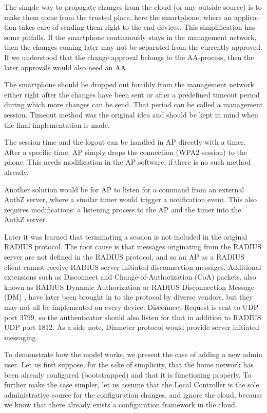 \documentclass[12pt,a4paper,english]{tutthesis}
\begin{document}
\begin{otherlanguage}{english}
The simple way to propagate changes from the cloud (or any outside
source) is to make them come from the trusted place, here the smartphone,
where an application takes care of sending them right to the end
devices. This simplification has some pitfalls. If the smartphone continuously stays
in the management network, then the changes coming later may not be 
separated from the currently approved.
If we understood that the change approval belongs to the AA-process, then
the later approvals would also need an AA.

 The smartphone should be dropped out forcibly from the management
network either right after the changes have been sent or after a
predefined timeout period during which more changes can be send.  That
period can be called a management session.  Timeout method was the
original idea and should be kept in mind when the final implementation
is made.

The session time and the logout can be handled in AP directly with
a timer. After a specific time, AP simply drops the connection
(WPA2-session) to the phone. This needs modification in the AP
software, if there is no such method already.

Another solution would be for AP to listen for a command from an external
AuthZ server, where a similar timer would trigger a notification event. 
This also requires modifications:  a listening process to the AP and 
the timer into the AuthZ server. 




Later it was learned \cite{rfc2865} that terminating a session is not
included in the original RADIUS protocol.  The root cause is that
messages originating from the RADIUS server are not defined in the
RADIUS protocol, and so an AP as a RADIUS client cannot receive RADIUS
server initiated disconnection messages.  Additional extensions such
as Disconnect and Change-of-Authorization (CoA) packets, also known as
RADIUS Dynamic Authorization or RADIUS Disconnection Message (DM) \cite{rfc5176}, have
later been brought in to the protocol by diverse
vendors, but they may not all be implemented on every device.
Disconnect-Request is sent to UDP port 3799, so the  authenticator should
also listen for  that in addition to RADIUS UDP port 1812.
As a side note, Diameter protocol would provide server initiated messaging.



To demonstrate how the model works, we present the case of adding a
new admin user. Let us first suppose, for the sake  of simplicity, that the
home network has been already configured (bootstrapped) and that it is
functioning properly.  To further make the case simpler, let us assume
that the Local Controller is the sole administrative source for the
configuration changes, and ignore the cloud, 
because we know that there already exists a configuration framework in the cloud.



\end{otherlanguage}
\end{document}
